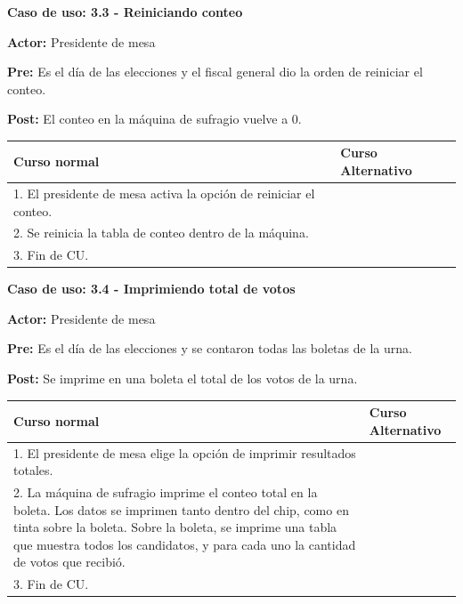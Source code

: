 \textbf{Caso de uso: 3.3 - Reiniciando conteo}

\textbf{Actor:} Presidente de mesa

\textbf{Pre:} Es el día de las elecciones y el fiscal general dio la orden de reiniciar el conteo.

\textbf{Post:} El conteo en la máquina de sufragio vuelve a 0.

\begin{table}[h!]
	
 \begin{tabular}{|p{7.5cm} | p{7.5cm}|} 
 \hline
 \textbf{Curso normal} & \textbf{Curso Alternativo} \\
 \hline


1. El presidente de mesa activa la opción de reiniciar el conteo. & \\
\hline

2. Se reinicia la tabla de conteo dentro de la máquina. & \\
\hline


3. Fin de CU. & \\
\hline
\end{tabular}
\end{table}


\textbf{Caso de uso: 3.4 - Imprimiendo total de votos}

\textbf{Actor:} Presidente de mesa

\textbf{Pre:} Es el día de las elecciones y se contaron todas las boletas de la urna.

\textbf{Post:} Se imprime en una boleta el total de los votos de la urna.

\begin{table}[h!]
	
 \begin{tabular}{|p{7.5cm} | p{7.5cm}|} 
 \hline
 \textbf{Curso normal} & \textbf{Curso Alternativo} \\
 \hline


1. El presidente de mesa elige la opción de imprimir resultados totales. & \\
\hline

2. La máquina de sufragio imprime el conteo total en la boleta. Los datos se imprimen tanto dentro del chip, como en tinta sobre la boleta. Sobre la boleta, se imprime una tabla que muestra todos los candidatos, y para cada uno la cantidad de votos que recibió. & \\
\hline

3. Fin de CU. & \\
\hline
\end{tabular}
\end{table}


